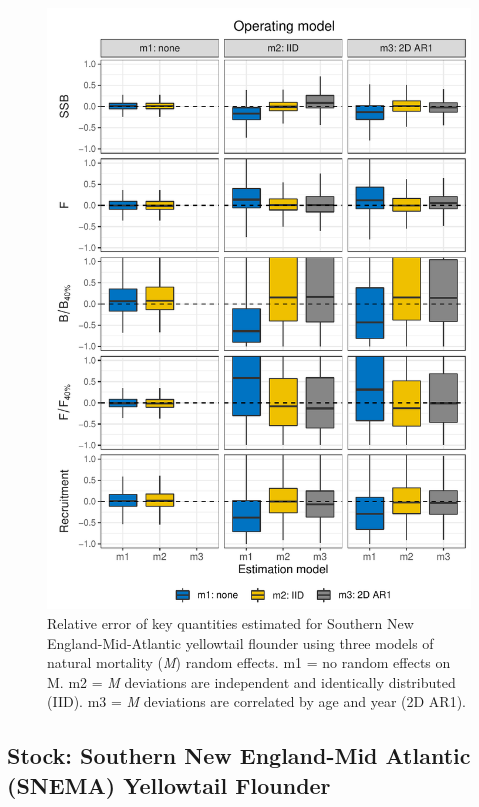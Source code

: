 \documentclass[]{article}
\begin{document}
\begin{figure}
\includegraphics[width=6in]{wham-sim-paper_files/figure-latex/snemayt-m-1} \caption{Relative error of key quantities estimated for Southern New England-Mid-Atlantic yellowtail flounder using three models of natural mortality (\textit{M}) random effects. m1 = no random effects on M. m2 = \textit{M} deviations are independent and identically distributed (IID). m3 = \textit{M} deviations are correlated by age and year (2D AR1).}\label{fig:snemayt-m}
\end{figure}

\pagebreak

\hypertarget{stock-southern-new-england-mid-atlantic-snema-yellowtail-flounder}{%
\subsection{Stock: Southern New England-Mid Atlantic (SNEMA) Yellowtail
Flounder}\label{stock-southern-new-england-mid-atlantic-snema-yellowtail-flounder}}
\end{document}

